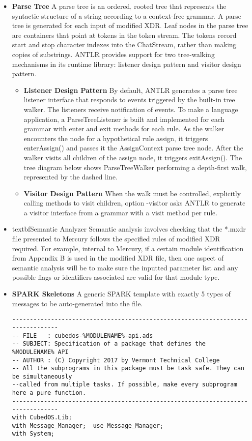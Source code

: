 \begin{itemize}
\item \textbf{Parse Tree} A parse tree is an ordered, rooted tree that represents the syntactic
structure of a string according to a context-free grammar. A parse tree is generated for each
input of modified XDR. Leaf nodes in the parse tree are containers that point at tokens in the
token stream. The tokens record start and stop character indexes into the ChatStream, rather
than making copies of substrings. ANTLR provides support for two tree-walking mechanisms in its
runtime library: listener design pattern and visitor design pattern.
  
  \begin{itemize}
  \item \textbf{Listener Design Pattern} By default, ANTLR generates a parse tree listener
  interface that responds to events triggered by the built-in tree walker. The listeners receive
  notification of events. To make a language application, a ParseTreeListener is built and
  implemented for each grammar with enter and exit methods for each rule. As the walker
  encounters the node for a hypothetical rule assign, it triggers enterAssign() and passes it
  the AssignContext parse tree node. After the walker visits all children of the assign node, it
  triggers exitAssign(). The tree diagram below shows ParseTreeWalker performing a depth-first
  walk, represented by the dashed line.

  \item \textbf{Visitor Design Pattern} When the walk must be controlled, explicitly calling
  methods to visit children, option -visitor asks ANTLR to generate a visitor interface from a
  grammar with a visit method per rule.
  \end{itemize}

\item textbf{Semantic Analyzer} Semantic analysis involves checking that the *.mxdr file
presented to Mercury follows the specified rules of modified XDR required. For example, internal
to Mercury, if a certain module identification from Appendix B is used in the modified XDR file,
then one aspect of semantic analysis will be to make sure the inputted parameter list and any
possible flags or identifiers associated are valid for that module type.

\item \textbf{SPARK Skeletons} A generic SPARK template with exactly 5 types of messages to be
auto-generated into the file.
\begin{verbatim}
--------------------------------------------------------------------------------
-- FILE   : cubedos-%MODULENAME%-api.ads
-- SUBJECT: Specification of a package that defines the %MODULENAME% API
-- AUTHOR : (C) Copyright 2017 by Vermont Technical College
-- All the subprograms in this package must be task safe. They can be simultaneously
--called from multiple tasks. If possible, make every subprogram here a pure function.
--------------------------------------------------------------------------------
with CubedOS.Lib;
with Message_Manager;  use Message_Manager;
with System;


\end{verbatim}
\end{itemize}
